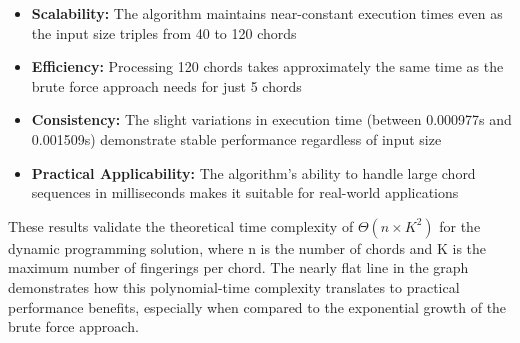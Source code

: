 \documentclass[conference]{IEEEtran}
\begin{document}
\begin{itemize}
    \item \textbf{Scalability:} The algorithm maintains near-constant execution times even as the input size triples from 40 to 120 chords
    \item \textbf{Efficiency:} Processing 120 chords takes approximately the same time as the brute force approach needs for just 5 chords
    \item \textbf{Consistency:} The slight variations in execution time (between 0.000977s and 0.001509s) demonstrate stable performance regardless of input size
    \item \textbf{Practical Applicability:} The algorithm's ability to handle large chord sequences in milliseconds makes it suitable for real-world applications
\end{itemize}

These results validate the theoretical time complexity of \(\Theta(n \times K^2)\) for the dynamic programming solution, where n is the number of chords and K is the maximum number of fingerings per chord. The nearly flat line in the graph demonstrates how this polynomial-time complexity translates to practical performance benefits, especially when compared to the exponential growth of the brute force approach.
\end{document}
